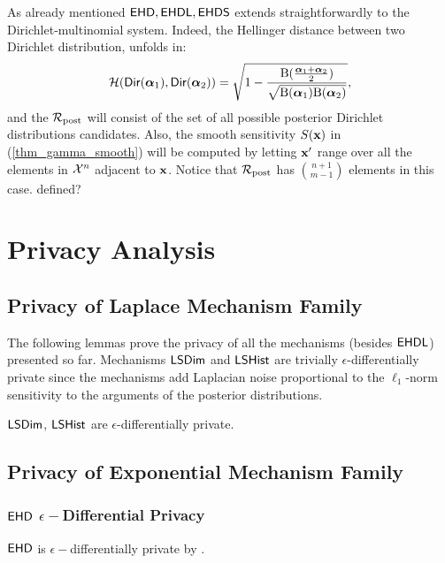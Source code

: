 \documentclass{article}
\begin{document}
As already mentioned $\mathsf{EHD}, \mathsf{EHDL}, \mathsf{EHDS}$ extends straightforwardly to the Dirichlet-multinomial system.
Indeed, the Hellinger distance between two Dirichlet distribution, unfolds in:
\[
  \mathcal{H}(\mathsf{Dir}(\boldsymbol{\alpha}_1), \mathsf{Dir}(\boldsymbol{\alpha}_2)) = \sqrt{1 - \frac{\textup{B}(\frac{\boldsymbol{\alpha}_1 + \boldsymbol{\alpha}_2}{2})}{\sqrt{\textup{B}(\boldsymbol{\alpha}_1) \textup{B}(\boldsymbol{\alpha}_2)}}},
\]
and the $\mathcal{R}_{\textup{post}}$ will consist of the set of all possible posterior Dirichlet
distributions candidates. Also, the smooth sensitivity $S(\textbf{x})$
in (\ref{thm_gamma_smooth}) will be computed by letting $\textbf{x}'$ range
over all the elements in $\mathcal{X}^{n}$ adjacent to $\textbf{x}$. Notice
that $\mathcal{R}_{\textup{post}}$ has $\binom{n + 1}{m - 1}$ elements in this case. {\color{red}{what is m here? and was $\datauni$} defined?}

\section{Privacy Analysis}

\subsection{Privacy of Laplace Mechanism Family}
The following lemmas prove the privacy of all the mechanisms (besides $\mathsf{EHDL}$) presented so far.
Mechanisms $\mathsf{LSDim}$ and $\mathsf{LSHist}$ are trivially $\epsilon$-differentially private since the mechanisms
add Laplacian noise proportional to the $\ell_1$-norm sensitivity to the arguments of the posterior distributions.
\begin{lem}
  $\mathsf{LSDim}$, $\mathsf{LSHist}$ are $\epsilon$-differentially private.
\end{lem}

\subsection{Privacy of Exponential Mechanism Family}
\subsubsection{$\mathsf{EHD}$ $\epsilon-$Differential Privacy}
\begin{lem}
\label{lem_exp_private}
$\mathsf{EHD}$ is $\epsilon-$differentially private by \cite{dwork2014algorithmic}.
\end{lem}


\end{document}
